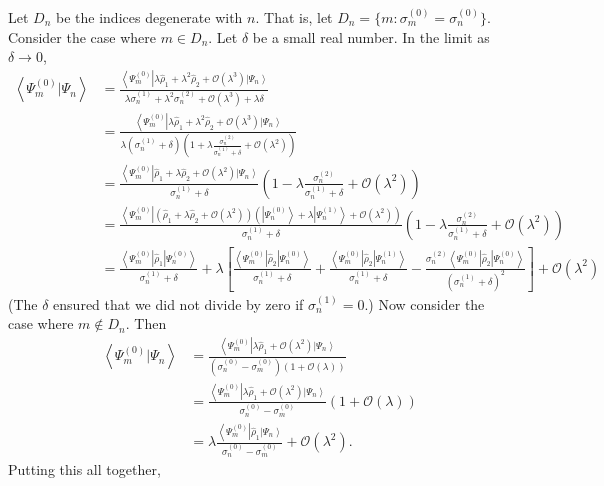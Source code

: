 \documentclass[11pt]{article}
\newcommand{\Od}[1]{\mathcal{O}{\left(#1\right)}}
\newcommand{\bra}[1]{\left\langle#1\right|}
\newcommand{\ket}[1]{\left|#1\right\rangle}
\newcommand{\braket}[2]{\left\langle#1|#2\right\rangle}
\newcommand{\op}[1]{\hat{#1}}
\theoremstyle{theorem}
\theoremstyle{remark}
\theoremstyle{step}
\theoremstyle{gap}
\begin{document}
Let \(D_n\) be the indices degenerate with \(n\). That is, let \(D_n = \{m : \sigma_m^{(0)} = \sigma_n^{(0)}\}\).
Consider the case where \(m \in D_n\). Let \(\delta\) be a small real number. In the limit as \(\delta \to 0\),
\begin{align*}
\braket{\Psi_m^{(0)}}{\Psi_n} &=\frac{\bra{\Psi_m^{(0)}} \lambda \op{\rho}_1 + \lambda^2 \op{\rho}_2 + \Od{\lambda^3} \ket{\Psi_n}}{\lambda \sigma_n^{(1)} + \lambda^2 \sigma_n^{(2)} + \Od{\lambda^3} + \lambda\delta} \\
&=\frac{\bra{\Psi_m^{(0)}} \lambda \op{\rho}_1 + \lambda^2 \op{\rho}_2 + \Od{\lambda^3} \ket{\Psi_n}}{\lambda \left(\sigma_n^{(1)}+ \delta\right)\left(1 + \lambda \frac{\sigma_n^{(2)}}{\sigma_n^{(1)}+\delta} + \Od{\lambda^2}\right) } \\
&=\frac{\bra{\Psi_m^{(0)}} \op{\rho}_1 + \lambda \op{\rho}_2 + \Od{\lambda^2} \ket{\Psi_n}}{\sigma_n^{(1)}+ \delta}\left(1 - \lambda \frac{\sigma_n^{(2)}}{\sigma_n^{(1)}+\delta} + \Od{\lambda^2}\right) \\
&= \frac{\bra{\Psi_m^{(0)}} \left(\op{\rho}_1 + \lambda \op{\rho}_2 + \Od{\lambda^2} \right)\left(\ket{\Psi_n^{(0)}} + \lambda \ket{\Psi_n^{(1)}} + \Od{\lambda^2}\right)}{\sigma_n^{(1)}+\delta}
\left(1 - \lambda \frac{\sigma_n^{(2)}}{\sigma_n^{(1)}+\delta} + \Od{\lambda^2}\right) \\
&=\frac{\bra{\Psi_m^{(0)}} \op{\rho}_1 \ket{\Psi_n^{(0)}}}{\sigma_n^{(1)} + \delta} + \lambda \left[\frac{\bra{\Psi_m^{(0)}}\op{\rho}_2\ket{\Psi_n^{(0)}}}{\sigma_n^{(1)} + \delta} + \frac{\bra{\Psi_m^{(0)}}\op{\rho}_2\ket{\Psi_n^{(1)}}}{\sigma_n^{(1)} + \delta} - \frac{\sigma_n^{(2)}\bra{\Psi_m^{(0)}}\op{\rho}_2\ket{\Psi_n^{(0)}}}{\left(\sigma_n^{(1)} + \delta\right)^2}\right] + \Od{\lambda^2}
\end{align*}
(The \(\delta\) ensured that we did not divide by zero if \(\sigma_n^{(1)}=0\).) Now consider the case where \(m \not\in D_n\). Then
\begin{align*}
\braket{\Psi_m^{(0)}}{\Psi_n} &=\frac{\bra{\Psi_m^{(0)}} \lambda \op{\rho}_1 + \Od{\lambda^2} \ket{\Psi_n}}{\left(\sigma_n^{(0)} - \sigma_m^{(0)}\right)\left(1+\Od{\lambda}\right)} \\
&=\frac{\bra{\Psi_m^{(0)}} \lambda \op{\rho}_1 + \Od{\lambda^2} \ket{\Psi_n}}{\sigma_n^{(0)} - \sigma_m^{(0)}}\left(1 + \Od{\lambda}\right) \\
&= \lambda\frac{\bra{\Psi_m^{(0)}} \op{\rho}_1 \ket{\Psi_n}}{\sigma_n^{(0)} - \sigma_m^{(0)}} + \Od{\lambda^2}.
\end{align*}
Putting this all together,
\end{document}
